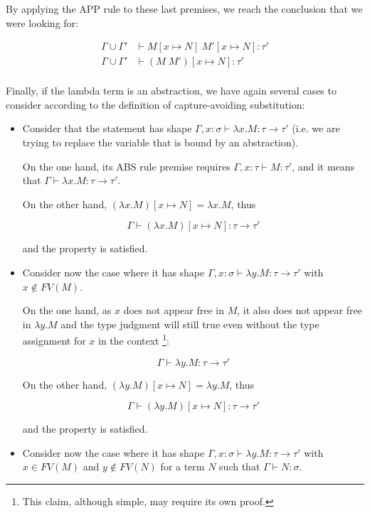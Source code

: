 \documentclass{article}
\begin{document}
By applying the APP rule to these last premises, we reach the 
conclusion that we were looking for:

\begin{align*}
  \Gamma \cup \Gamma' &\vdash M[x \mapsto N]\;M'[x \mapsto N]: \tau' \\
  \Gamma \cup \Gamma' &\vdash (M\;M')[x \mapsto N]: \tau' \\
\end{align*}

Finally, if the lambda term is an abstraction, we have again several 
cases to consider according to the definition of capture-avoiding 
substitution:

\begin{itemize}
  \item Consider that the statement has shape 
    $\Gamma, x: \sigma \vdash \lambda x. M : \tau \rightarrow \tau'$
    (i.e. we are trying to replace the variable that is bound by an 
    abstraction).

    On the one hand, its ABS rule premise requires 
    $\Gamma, x: \tau \vdash M : \tau'$, and it means that 
    $\Gamma \vdash \lambda x. M : \tau \rightarrow \tau'$.

    On the other hand, $(\lambda x. M)[x \mapsto N] = \lambda x. M$,
    thus 
    
    $$\Gamma \vdash (\lambda x. M)[x \mapsto N] : \tau \rightarrow \tau'$$

    and the property is satisfied.
  \item Consider now the case where it has shape 
    $\Gamma, x: \sigma \vdash \lambda y. M : \tau \rightarrow \tau'$ with 
    $x \notin FV(M)$.

    On the one hand, as $x$ does not appear free in $M$, it also does not appear 
    free in $\lambda y. M$ and the type judgment 
    will still true even without the type assignment for $x$ in the context
    \footnote{This claim, although simple, may require its own proof.}:

    $$\Gamma \vdash \lambda y. M : \tau \rightarrow \tau'$$

    On the other hand, $(\lambda y. M)[x \mapsto N] = \lambda y. M$,
    thus 
    
    $$\Gamma \vdash (\lambda y. M)[x \mapsto N] : \tau \rightarrow \tau'$$

    and the property is satisfied.
  \item Consider now the case where it has shape 
    $\Gamma, x: \sigma \vdash \lambda y. M : \tau \rightarrow \tau'$ with 
    $x \in FV(M)$ and $y \notin FV(N)$ for a term $N$ such that 
    $\Gamma \vdash N: \sigma$.


\end{itemize}
\end{document}
